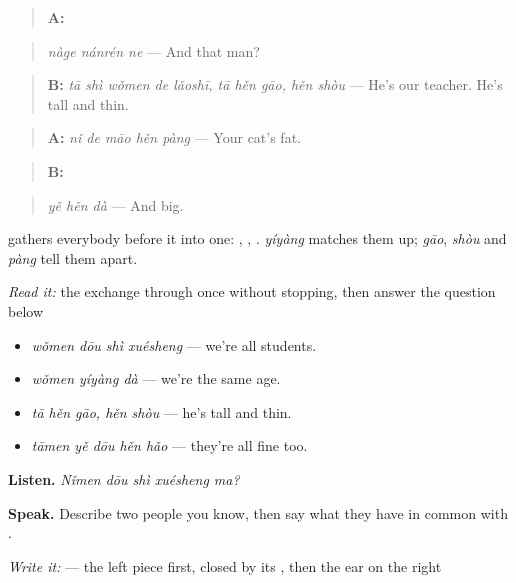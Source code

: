 \begin{quote}
\textbf{A:} 
\end{quote}

\begin{quote}
\emph{nàge nánrén ne} — And that man?
\end{quote}

\begin{quote}
\textbf{B:} \emph{tā shì wǒmen de lǎoshī, tā hěn gāo, hěn shòu} — He's our teacher. He's tall and thin.
\end{quote}

\begin{quote}
\textbf{A:} \emph{nǐ de māo hěn pàng} — Your cat's fat.
\end{quote}

\begin{quote}
\textbf{B:} 
\end{quote}

\begin{quote}
\emph{yě hěn dà} — And big.
\end{quote}

 gathers everybody before it into one: , , . \emph{yíyàng} matches them up; \emph{gāo}, \emph{shòu} and \emph{pàng} tell them apart.

\begin{tcolorbox}[breakable,skin=enhanced,colback=orange!6,colframe=orange!45!black,boxrule=0.5pt,arc=1mm,left=6pt,right=6pt,top=4pt,bottom=4pt,fonttitle=\bfseries,title={Read this}]
\emph{Read it:} the exchange through once without stopping, then answer the question below
\end{tcolorbox}

\begin{grammarlens}[title={What you've built — describing people}]
\begin{itemize}
\raggedright
  \item \textbf{} \emph{wǒmen dōu shì xuésheng} — we're all students.
  \item \emph{wǒmen yíyàng dà} — we're the same age.
  \item \emph{tā hěn gāo, hěn shòu} — he's tall and thin.
  \item \textbf{} \emph{tāmen yě dōu hěn hǎo} — they're all fine too.
\end{itemize}

\textbf{Listen.} \emph{Nǐmen dōu shì xuésheng ma?}

\textbf{Speak.} Describe two people you know, then say what they have in common with .

\emph{Write it:}  — the left piece first, closed by its , then the ear on the right
\end{grammarlens}

